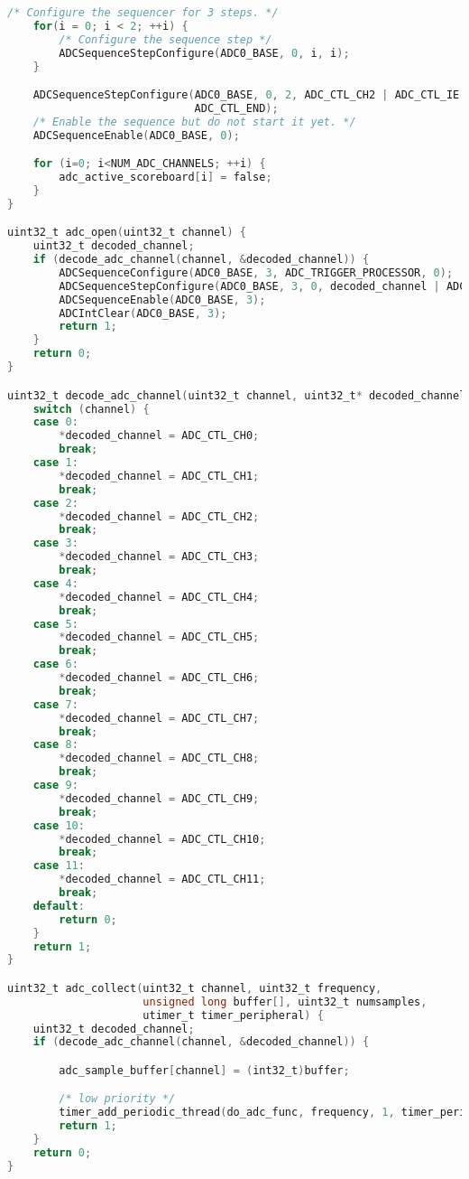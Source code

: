 \documentclass[12pt]{article}
\begin{document}
\begin{enumerate}[1)]
\begin{lstlisting}[language=C]
    /* Configure the sequencer for 3 steps. */
    for(i = 0; i < 2; ++i) {
        /* Configure the sequence step */
        ADCSequenceStepConfigure(ADC0_BASE, 0, i, i);
    }

    ADCSequenceStepConfigure(ADC0_BASE, 0, 2, ADC_CTL_CH2 | ADC_CTL_IE |
                             ADC_CTL_END);
    /* Enable the sequence but do not start it yet. */
    ADCSequenceEnable(ADC0_BASE, 0);

    for (i=0; i<NUM_ADC_CHANNELS; ++i) {
        adc_active_scoreboard[i] = false;
    }
}

uint32_t adc_open(uint32_t channel) {
    uint32_t decoded_channel;
    if (decode_adc_channel(channel, &decoded_channel)) {
        ADCSequenceConfigure(ADC0_BASE, 3, ADC_TRIGGER_PROCESSOR, 0);
        ADCSequenceStepConfigure(ADC0_BASE, 3, 0, decoded_channel | ADC_CTL_IE | ADC_CTL_END);
        ADCSequenceEnable(ADC0_BASE, 3);
        ADCIntClear(ADC0_BASE, 3);
        return 1;
    }
    return 0;
}

uint32_t decode_adc_channel(uint32_t channel, uint32_t* decoded_channel) {
    switch (channel) {
    case 0:
        *decoded_channel = ADC_CTL_CH0;
        break;
    case 1:
        *decoded_channel = ADC_CTL_CH1;
        break;
    case 2:
        *decoded_channel = ADC_CTL_CH2;
        break;
    case 3:
        *decoded_channel = ADC_CTL_CH3;
        break;
    case 4:
        *decoded_channel = ADC_CTL_CH4;
        break;
    case 5:
        *decoded_channel = ADC_CTL_CH5;
        break;
    case 6:
        *decoded_channel = ADC_CTL_CH6;
        break;
    case 7:
        *decoded_channel = ADC_CTL_CH7;
        break;
    case 8:
        *decoded_channel = ADC_CTL_CH8;
        break;
    case 9:
        *decoded_channel = ADC_CTL_CH9;
        break;
    case 10:
        *decoded_channel = ADC_CTL_CH10;
        break;
    case 11:
        *decoded_channel = ADC_CTL_CH11;
        break;
    default:
        return 0;
    }
    return 1;
}

uint32_t adc_collect(uint32_t channel, uint32_t frequency,
                     unsigned long buffer[], uint32_t numsamples,
                     utimer_t timer_peripheral) {
    uint32_t decoded_channel;
    if (decode_adc_channel(channel, &decoded_channel)) {

        adc_sample_buffer[channel] = (int32_t)buffer;

        /* low priority */
        timer_add_periodic_thread(do_adc_func, frequency, 1, timer_peripheral);
        return 1;
    }
    return 0;
}


\end{lstlisting}
\end{enumerate}
\end{document}
